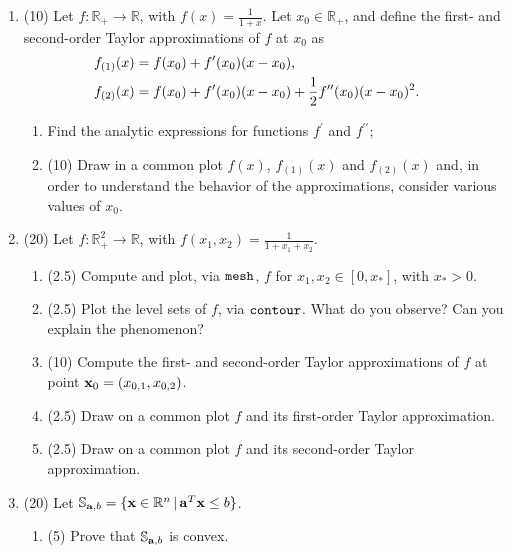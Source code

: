 \documentclass[12pt]{article}
\begin{document}
\begin{enumerate}
\item 
(10) Let $f:\mathbb{R}_{+} \rightarrow \mathbb{R}$, with $f(x) = \frac{1}{1+x}$. Let $x_0\in \mathbb{R}_{+}$,
and define the first- and second-order Taylor approximations of $f$ at $x_0$ as
\begin{equation}
\begin{split}
f_{(1)}(x) & = f(x_0) + f^{\prime}(x_0) (x-x_0), \cr
f_{(2)}(x) & = f(x_0) + f^{\prime}(x_0) (x-x_0) + \frac{1}{2} f^{\prime\prime}(x_0) (x-x_0)^2. \cr
\end{split} 
\end{equation}

\begin{enumerate}
\item 
Find the analytic expressions for functions $f^{\prime}$ and $f^{\prime\prime}$;
\item 
{\color{blue} (10)} Draw in a common plot $f(x)$, $f_{(1)}(x)$ and $f_{(2)}(x)$ and, in order to understand the behavior of the approximations, consider various values of $x_0$. 
\end{enumerate}

\item 
(20) 
Let $f:\mathbb{R}_+^2 \rightarrow \mathbb{R}$, with $f(x_1,x_2) = \frac{1}{1+x_1+x_2}$.
\begin{enumerate}
\item 
{\color{blue} (2.5)} Compute and plot, via ${\tt mesh}$, $f$ for $x_1,x_2\in[0, x_*]$, with $x_*>0$.

\item
{\color{blue} (2.5)} Plot the level sets of $f$, via ${\tt contour}$. What do you observe? Can you explain the phenomenon?

\item 
{\color{blue} (10)} Compute the first- and second-order Taylor approximations of $f$ at point ${\bf x}_0 = (x_{0,1},x_{0,2})$. 

\item 
{\color{blue} (2.5)} Draw on a common plot $f$ and its first-order Taylor approximation.

\item 
{\color{blue} (2.5)} Draw on a common plot $f$ and its second-order Taylor approximation.
\end{enumerate}


\newpage 
\item (20)
Let $\mathbb{S}_{{\bf a},b} = \{ {\bf x}\in\mathbb{R}^n \, | \, {\bf a}^T {\bf x} \le b \}$. 
\begin{enumerate}
\item 
{\color{blue} (5)} Prove that $\mathbb{S}_{{\bf a}, b}$ is convex.


\end{enumerate}
\end{enumerate}
\end{document}
